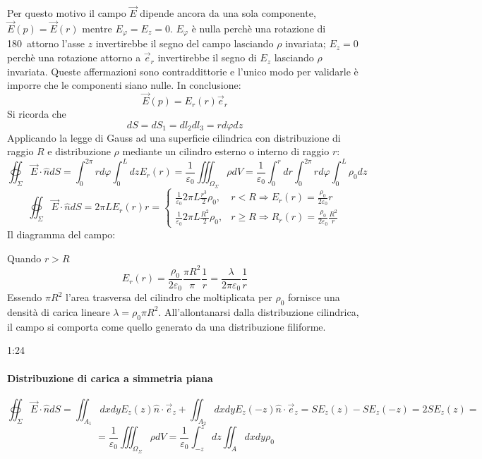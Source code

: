 Per questo motivo il campo $\vec{E}$ dipende ancora da una sola componente, $\vec{E}(p) = \vec{E}(r)$
mentre $E_\varphi = E_z = 0$. $E_\varphi$ è nulla perchè una rotazione di 180\textdegree\ attorno
l'asse $z$ invertirebbe il segno del campo lasciando $\rho$ invariata; $E_z = 0$ perchè una rotazione
attorno a $\vec{e}_r$ invertirebbe il segno di $E_z$ lasciando $\rho$ invariata.
Queste affermazioni sono contraddittorie e l'unico modo per validarle è imporre che le componenti
siano nulle. In conclusione:
$$
\vec{E}(p) = E_r(r)\vec{e}_r
$$
Si ricorda che
$$
dS = dS_1 = dl_2 dl_3 = rd\varphi dz
$$
Applicando la legge di Gauss ad una superficie cilindrica con distribuzione di raggio $R$ e distribuzione $\rho$ mediante un cilindro esterno o interno di raggio $r$:
$$
\oiint_\Sigma\vec{E}\cdot\hat{n}dS = \int_0^{2\pi}rd\varphi \int_0^L dz E_r(r) = \frac{1}{\varepsilon_0}
\iiint_{\Omega_\Sigma}\rho dV = \frac{1}{\varepsilon_0} \int_{0}^{r}dr\int_{0}^{2\pi} rd\varphi\int_0^L \rho_0 dz 
$$
$$
\oiint_\Sigma\vec{E}\cdot\hat{n}dS = 2\pi L E_r(r) r =
\begin{cases}
\frac{1}{\varepsilon_0} 2 \pi L \frac{r^3}{2}\rho_0, & r < R \Rightarrow E_r(r) = \frac{\rho_0}{2\varepsilon_0}r\\
\frac{1}{\varepsilon_0} 2 \pi L \frac{R^2}{2}\rho_0, & r\geq R \Rightarrow R_r(r) = \frac{\rho_0}{2\varepsilon_0} \frac{R^2}{r}
\end{cases}
$$
Il diagramma del campo:
\begin{center} %
\end{center}

Quando $r > R$ 
$$
E_r(r) = \frac{\rho_0}{2\varepsilon_0} \frac{\pi R^2}{\pi} \frac{1}{r} = 
\frac{\lambda}{2\pi\varepsilon_0} \frac{1}{r}
$$
Essendo $\pi R^2$ l'area trasversa del cilindro che moltiplicata per $\rho_0$ fornisce una densità di
carica lineare $\lambda = \rho_0 \pi R^2$. All'allontanarsi dalla distribuzione cilindrica, il campo si
comporta come quello generato da una distribuzione filiforme.

1:24
\paragraph{Distribuzione di carica a simmetria piana}

$$
\oiint_\Sigma \vec{E}\cdot\hat{n}dS = \iint_{A_1} dxdy E_z(z)\hat{n}\cdot\vec{e}_z + 
\iint_{A_2} dxdy E_z(-z)\hat{n}\cdot\vec{e}_z = SE_z(z) -SE_z(-z) = 2 S E_z(z) =
$$
$$
=\frac{1}{\varepsilon_0} \iiint_{\Omega_\Sigma} \rho dV = \frac{1}{\varepsilon_0} \int_{-z}^{z}dz \iint_A dxdy\rho_0
$$




